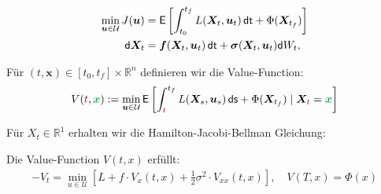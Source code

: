 \documentclass[a4paper, 12pt]{scrartcl}
\newcommand{\gruen}[2][cadGreen]{\textcolor{#1}{#2}}
\newcommand{\dunkelrot}[2][dunkelrot]{\textcolor{#1}{#2}}
\newcommand{\dt}{\thinspace \mathsf{dt}}
\newcommand{\ds}{\thinspace \mathsf{ds}}
\begin{document}
\begin{align*}
    \min_{\bm{u} \in \mathcal{U}} J(\bm{u}) 
    &= \mathsf{E}
    \left[
        \int_{t_0}^{t_f} L(\bm{X}_t, \bm{u}_t) \dt + \Phi(\bm{X}_{t_f})
    \right]
    \\
    \mathsf{d}\bm{X}_t 
    &= 
    \bm{f}(\bm{X}_t,\bm{u}_t) \dt 
    + 
    \bm{\sigma}(\bm{X}_t,\bm{u}_t) \mathsf{d}W_t,
\end{align*}


Für $(t,\bm{x}) \in [t_0,t_f] \times \mathbb{R}^n$ definieren wir die Value-Function:
\begin{align*}
    V(\dunkelrot{t},\gruen{\bm{x}}) := \min_{\bm{u} \in \mathcal{U}} 
    \mathsf{E}
    \left[
        \int_{\dunkelrot{t}}^{t_f} 
        L(\bm{X}_s,\bm{u}_s) \ds
        + 
        \Phi(\bm{X}_{t_f}) 
        \mid \bm{X}_{\dunkelrot{t}} = \gruen{\bm{x}}
    \right]
\end{align*}

Für $X_t \in \mathbb{R}^1$ erhalten wir die Hamilton-Jacobi-Bellman Gleichung:

\begin{satz}\label{HJB_Gleichung}
    Die Value-Function $V(t,x)$ erfüllt:
    \begin{align*}
        - V_t = \min_{u \in \mathcal{U}} 
        \left[
            L +  f \cdot  V_x(t,x) 
            + \frac{1}{2} \sigma^2 \cdot V_{xx}(t,x)
        \right], 
        \quad V(T,x) = \Phi(x)
    \end{align*}
\end{satz} 
\end{document}
